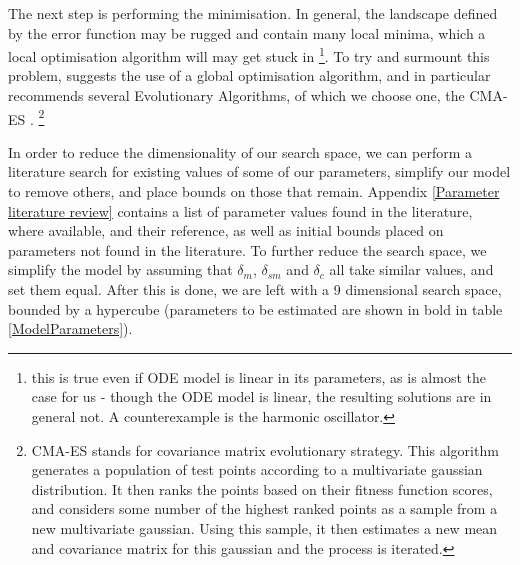\documentclass[10pt,journal]{./IEEE_latex_class/IEEEtran}
\begin{document}
The next step is performing the minimisation. In general, the landscape defined by the error function may be rugged and contain many local minima, which a local optimisation algorithm will may get stuck in \footnote{this is true even if ODE model is linear in its parameters, as is almost the case for us - though the ODE model is linear, the resulting solutions are in general not. A counterexample is the harmonic oscillator.}. To try and surmount this problem, \cite{Algorithms2003} suggests the use of a global optimisation algorithm, and in particular recommends several Evolutionary Algorithms, of which we choose one, the CMA-ES \cite{Hansen2006,Hansen2011}. \footnote{CMA-ES stands for covariance matrix evolutionary strategy. This algorithm generates a population of test points according to a multivariate gaussian distribution. It then ranks the points based on their fitness function scores, and  considers some number of the highest ranked points as a sample from a new multivariate gaussian. Using this sample, it then estimates a new mean and covariance matrix for this gaussian and the process is iterated.}

In order to reduce the dimensionality of our search space, we can perform a literature search for existing values of some of our parameters, simplify our model to remove others, and place bounds on those that remain. Appendix \ref{Parameter literature review} contains a list of parameter values found in the literature, where available, and their reference, as well as initial bounds placed on parameters not found in the literature. To further reduce the search space, we simplify the model by assuming that $\delta_m$, $\delta_{sm}$ and $\delta_c$ all take similar values, and set them equal. After this is done, we are left with a 9 dimensional search space, bounded by a hypercube (parameters to be estimated are shown in bold in table \ref{ModelParameters}).
\end{document}
